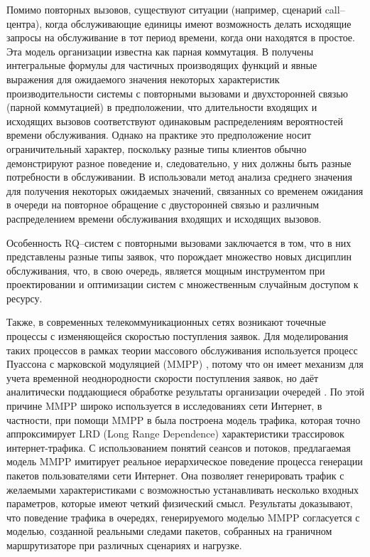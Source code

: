 Помимо повторных вызовов, существуют ситуации (например, сценарий call--центра), когда обслуживающие единицы имеют возможность делать исходящие запросы на обслуживание в тот период времени, когда они находятся в простое. Эта модель организации известна как парная коммутация. В \cite{falin1979model} получены интегральные формулы для частичных производящих функций и явные выражения для ожидаемого значения некоторых характеристик производительности системы с повторными вызовами и двухсторонней связью (парной коммутацией) в предположении, что длительности входящих и исходящих вызовов соответствуют одинаковым распределениям вероятностей времени обслуживания. Однако на практике это предположение носит ограничительный характер, поскольку разные типы клиентов обычно демонстрируют разное поведение и, следовательно, у них должны быть разные потребности в обслуживании. В \cite{artalejo2010mean} использовали метод анализа среднего значения для получения некоторых ожидаемых значений, связанных со временем ожидания в очереди на повторное обращение с двусторонней связью и различным распределением времени обслуживания входящих и исходящих вызовов.

Особенность RQ--систем с повторными вызовами заключается в том, что в них представлены разные типы заявок, что порождает множество новых дисциплин обслуживания, что, в свою очередь, является мощным инструментом при проектировании и оптимизации систем с множественным случайным доступом к ресурсу.

Также, в современных телекоммуникационных сетях возникают точечные процессы с изменяющейся скоростью поступления заявок. Для моделирования таких процессов в рамках теории массового обслуживания используется процесс Пуассона с марковской модуляцией (MMPP) \cite{baiocchi1993steady,lapatin2019asymptotic}, потому что он имеет механизм для учета временной неоднородности скорости поступления заявок, но даёт аналитически поддающиеся обработке результаты организации очередей \cite{meier1987fitting}. По этой причине MMPP широко используется в исследованиях сети Интернет, в частности, при помощи MMPP в  \cite{muscariello2004mmpp} была построена модель трафика, которая точно аппроксимирует LRD (Long Range Dependence) характеристики трассировок интернет-трафика. С использованием понятий сеансов и потоков, предлагаемая модель MMPP имитирует реальное иерархическое поведение процесса генерации пакетов пользователями сети Интернет. Она позволяет генерировать трафик с желаемыми характеристиками с возможностью устанавливать несколько входных параметров, которые имеют четкий физический смысл. Результаты доказывают, что поведение трафика в очередях, генерируемого моделью MMPP согласуется с моделью, созданной реальными следами пакетов, собранных на граничном маршрутизаторе при различных сценариях и нагрузке.

